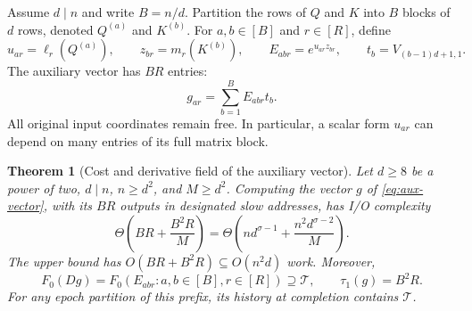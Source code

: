 \documentclass[11pt]{article}
\newtheorem{theorem}{Theorem}[section]
\theoremstyle{definition}
\theoremstyle{remark}
\newcommand{\cT}{\mathcal T}
\begin{document}
Assume $d\mid n$ and write $B=n/d$. Partition the rows of $Q$ and $K$
into $B$ blocks of $d$ rows, denoted $Q^{(a)}$ and $K^{(b)}$.
For $a,b\in[B]$ and $r\in[R]$, define
\begin{equation}
 u_{ar}=\ell_r(Q^{(a)}),\qquad
 z_{br}=m_r(K^{(b)}),\qquad
 E_{abr}=e^{u_{ar}z_{br}},\qquad
 t_b=V_{(b-1)d+1,1}.
 \label{eq:forms}
\end{equation}
The auxiliary vector has $BR$ entries:
\begin{equation}
 g_{ar}=\sum_{b=1}^B E_{abr}t_b.
 \label{eq:aux-vector}
\end{equation}
All original input coordinates remain free. In particular, a scalar
form $u_{ar}$ can depend on many entries of its full matrix block.

\begin{theorem}[Cost and derivative field of the auxiliary vector]
\label{thm:bilinear-prefix}
Let $d\ge8$ be a power of two, $d\mid n$, $n\ge d^2$, and $M\ge d^2$.
Computing the vector $g$ of \cref{eq:aux-vector}, with its $BR$ outputs
in designated slow addresses, has I/O complexity
\begin{equation}
 \Theta\!\left(BR+\frac{B^2R}{M}\right)
 =\Theta\!\left(nd^{\sigma-1}
              +\frac{n^2d^{\sigma-2}}M\right).
 \label{eq:aux-io}
\end{equation}
The upper bound has $O(BR+B^2R)\subseteq O(n^2d)$ work. Moreover,
\begin{equation}
 F_0(Dg)=F_0(E_{abr}:a,b\in[B],r\in[R])\supseteq\cT,
 \qquad \tau_1(g)=B^2R.
 \label{eq:aux-field}
\end{equation}
For any epoch partition of this prefix, its history at completion
contains $\cT$.
\end{theorem}
\end{document}
